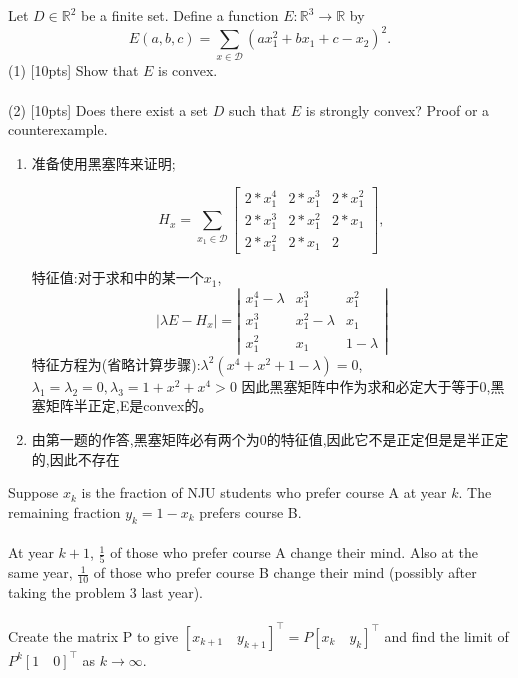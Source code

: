 \documentclass[11pt, a4paper, UTF8]{ctexart}
\begin{document}
\begin{problem}[ML problem 2]
	Let $D\in \mathbb{R}^2$ be a finite set. Define a function $E: \mathbb{R}^3 \rightarrow \mathbb{R}$ by\\
\begin{equation}
E(a,b,c)=\sum\limits_{x\in\mathcal{D}}(ax^2_1+bx_1+c-x_2)^2.
\end{equation}
(1) [10pts] Show that $E$ is convex.\\ \\
(2) [10pts] Does there exist a set $D$ such that $E$ is strongly convex? Proof or a counterexample.
\end{problem}
\begin{solution}
    \begin{enumerate}
    	\item 准备使用黑塞阵来证明;
    	
    $$
    	H_x=\sum\limits_{x_1\in\mathcal{D}}{
    		\left[ \begin{array}{ccc}
    		2*x_{1}^{4} & 2*x_1^{3} & 2*x_1^{2}\\
    		2*x_1^{3} & 2*x_{1}^{2} & 2*x_1\\
    		2*x_1^{2} & 2*x_1 & 2
    		\end{array} 
    		\right ]}, 
    	$$
    	
	特征值:对于求和中的某一个$x_1$,$$|\lambda E-H_x|={
    		\left| \begin{array}{ccc}
    		x_{1}^{4}-\lambda & x_1^{3} & x_1^{2}\\
    		x_1^{3} & x_{1}^{2}-\lambda & x_1\\
    		x_1^{2} & x_1 & 1-\lambda
    		\end{array} 
    		\right |}
	$$
	特征方程为(省略计算步骤):$\lambda^{2}(x^{4}+x^{2}+1-\lambda )=0$,$\lambda_{1}=\lambda_{2}=0,\lambda_{3}=1+x^{2}+x^{4}>0$
	因此黑塞矩阵中作为求和必定大于等于0,黑塞矩阵半正定,E是convex的。
    
    \item 由第一题的作答,黑塞矩阵必有两个为0的特征值,因此它不是正定但是是半正定的,因此不存在
    \end{enumerate}
\end{solution}




\begin{problem}[ML problem 3]
Suppose $x_k$ is the fraction of NJU students who prefer course A at year $k$. The remaining fraction $y_k = 1-x_k$ prefers course B. \\\\
At year $k + 1$, $\frac{1}{5}$ of those who prefer course A change their mind. Also at the same year, $\frac{1}{10}$ of those who prefer course B change their mind (possibly after taking the problem 3 last year). \\ \\ 
Create the matrix P to give $[x_{k+1}\quad y_{k+1}]^\top = P [x_k\quad y_k]^\top$ and find the limit of $P^k[1\quad 0]^\top$ as $k \rightarrow \infty$.
\end{problem}
\end{document}
